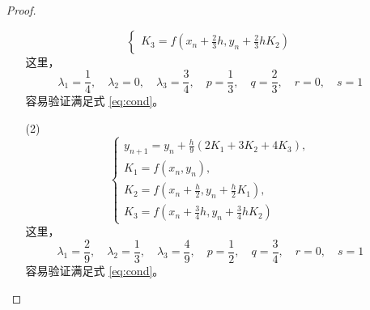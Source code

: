 \documentclass{sjtuarticle}
\def\DD{\mathrm{D}}
\begin{document}
\begin{itemize}
\begin{proof}
\begin{itemize}
\begin{equation*}
\begin{cases}
                    K_3=f\left(x_n+\frac{2}{3}h,y_n+\frac{2}{3}hK_2\right)
                \end{cases}
            \end{equation*}
            这里，
            \begin{equation*}
                \lambda_1=\frac{1}{4},\quad \lambda_2=0,\quad \lambda_3=\frac{3}{4},\quad p=\frac{1}{3},\quad q=\frac{2}{3},\quad r=0,\quad s=1
            \end{equation*}
            容易验证满足式 \eqref{eq:cond}。
            \item[(2)]
            \begin{equation*}
                \begin{cases}
                    y_{n+1}=y_n+\frac{h}{9}(2K_1+3K_2+4K_3),\\
                    K_1=f(x_n,y_n),\\
                    K_2=f\left(x_n+\frac{h}{2},y_n+\frac{h}{2}K_1\right),\\
                    K_3=f\left(x_n+\frac{3}{4}h,y_n+\frac{3}{4}hK_2\right)
                \end{cases}
            \end{equation*}
            这里，
            \begin{equation*}
                \lambda_1=\frac{2}{9},\quad \lambda_2=\frac{1}{3},\quad \lambda_3=\frac{4}{9},\quad p=\frac{1}{2},\quad q=\frac{3}{4},\quad r=0,\quad s=1
            \end{equation*}
            容易验证满足式 \eqref{eq:cond}。
        \end{itemize}
    \end{proof}


\end{itemize}
\end{document}
